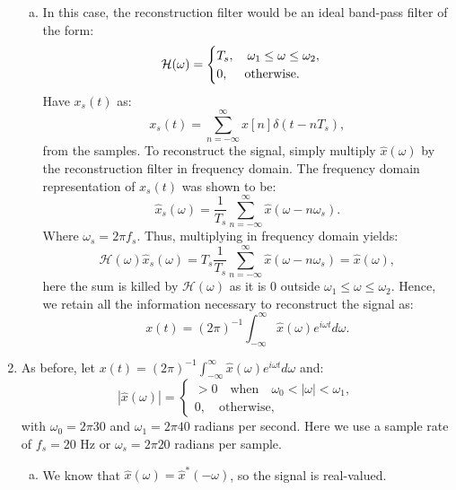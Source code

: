 \begin{enumerate}
\begin{enumerate}[a)]
          \item In this case, the reconstruction filter would be an ideal band-pass filter of the form:
                \[\mathcal{H}(\omega)=\begin{cases}
                    T_{s}, \quad \omega_{1}\le\omega\le\omega_{2}, \\
                    0, \quad \hspace{0.1cm}\text{otherwise}.
                  \end{cases}\]
                Have $x_{s}(t)$ as:
                \[ x_{s}(t)=\sum_{n=-\infty}^{\infty}x[n]\delta(t-nT_{s}), \]
                from the samples. To reconstruct the signal, simply multiply $\hat{x}(\omega)$ by the reconstruction 
                filter in frequency domain. The frequency domain representation of $x_{s}(t)$ was shown to be:
                \[ \hat{x}_{s}(\omega)=\frac{1}{T_{s}}\sum_{n=-\infty}^{\infty}\hat{x}(\omega-n\omega_{s}). \]
                Where $\omega_{s}=2\pi f_{s}$. Thus, multiplying in frequency domain yields:
                \[ \mathcal{H}(\omega)\hat{x}_{s}(\omega)=T_{s}\frac{1}{T_{s}}\sum_{n=-\infty}^{\infty}\hat{x}(\omega-n\omega_{s})=\hat{x}(\omega), \]
                here the sum is killed by $\mathcal{H}(\omega)$ as it is $0$ 
                outside $\omega_{1}\le\omega\le\omega_{2}$. 
                Hence, we retain all the information necessary to reconstruct the signal as:
                \[ x(t)=(2\pi)^{-1}\int_{-\infty}^{\infty}\hat{x}(\omega)e^{i\omega t}d\omega. \]
        \end{enumerate}


  \item As before, let $x(t)=(2\pi)^{-1}\int_{-\infty}^{\infty}\hat{x}(\omega)e^{i\omega t}d\omega$ and:
        \[|\hat{x}(\omega)|=\begin{cases}
            > 0 \quad    \text{when} \quad \omega_{0}<|\omega|<\omega_{1}, \\
            0, \quad     \text{otherwise},
          \end{cases}\]
        with $\omega_{0}=2\pi30$ and $\omega_{1}=2\pi40$ radians per second. 
        Here we use a sample rate of $f_{s}=20$ Hz or $\omega_{s}=2\pi 20$ radians per sample.

        \begin{enumerate}[a)]
          \item We know that $\hat{x}(\omega)=\hat{x}^{*}(-\omega)$, so the signal is real-valued.


\end{enumerate}
\end{enumerate}
